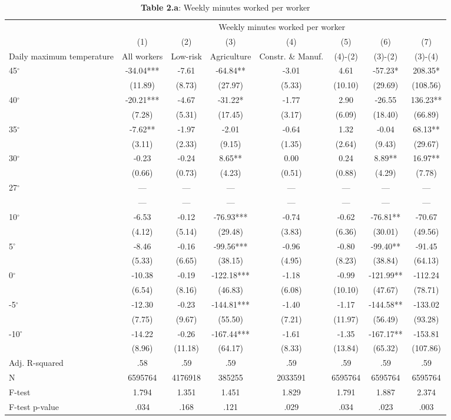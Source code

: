 \begin{table}[H]
\centering
\caption{\textbf{Table 2.a}: Weekly minutes worked per worker}
\begin{tabular}{lccccccc}
\hline\hline
 & \multicolumn{7}{c}{Weekly minutes worked per worker} \\
\cline{2-8}
 & (1) & (2) & (3) & (4) & (5) & (6) & (7) \\
Daily maximum temperature & All workers & Low-risk & Agriculture & Constr. \& Manuf. & (4)-(2) & (3)-(2) & (3)-(4) \\
\hline
45$^\circ$ & -34.04*** & -7.61 & -64.84** & -3.01 & 4.61 & -57.23* & 208.35* \\
 & (11.89) & (8.73) & (27.97) & (5.33) & (10.10) & (29.69) & (108.56) \\
40$^\circ$ & -20.21*** & -4.67 & -31.22* & -1.77 & 2.90 & -26.55 & 136.23** \\
 & (7.28) & (5.31) & (17.45) & (3.17) & (6.09) & (18.40) & (66.89) \\
35$^\circ$ & -7.62** & -1.97 & -2.01 & -0.64 & 1.32 & -0.04 & 68.13** \\
 & (3.11) & (2.33) & (9.15) & (1.35) & (2.64) & (9.43) & (29.67) \\
30$^\circ$ & -0.23 & -0.24 & 8.65** & 0.00 & 0.24 & 8.89** & 16.97** \\
 & (0.66) & (0.73) & (4.23) & (0.51) & (0.88) & (4.29) & (7.78) \\
27$^\circ$ & --- & --- & --- & --- & --- & --- & --- \\
 & --- & --- & --- & --- & --- & --- & --- \\
10$^\circ$ & -6.53 & -0.12 & -76.93*** & -0.74 & -0.62 & -76.81** & -70.67 \\
 & (4.12) & (5.14) & (29.48) & (3.83) & (6.36) & (30.01) & (49.56) \\
5$^\circ$ & -8.46 & -0.16 & -99.56*** & -0.96 & -0.80 & -99.40** & -91.45 \\
 & (5.33) & (6.65) & (38.15) & (4.95) & (8.23) & (38.84) & (64.13) \\
0$^\circ$ & -10.38 & -0.19 & -122.18*** & -1.18 & -0.99 & -121.99** & -112.24 \\
 & (6.54) & (8.16) & (46.83) & (6.08) & (10.10) & (47.67) & (78.71) \\
-5$^\circ$ & -12.30 & -0.23 & -144.81*** & -1.40 & -1.17 & -144.58** & -133.02 \\
 & (7.75) & (9.67) & (55.50) & (7.21) & (11.97) & (56.49) & (93.28) \\
-10$^\circ$ & -14.22 & -0.26 & -167.44*** & -1.61 & -1.35 & -167.17** & -153.81 \\
 & (8.96) & (11.18) & (64.17) & (8.33) & (13.84) & (65.32) & (107.86) \\
\hline
Adj. R-squared & .58 & .59 & .59 & .59 & .59 & .59 & .59 \\
N & 6595764 & 4176918 & 385255 & 2033591 & 6595764 & 6595764 & 6595764 \\
F-test & 1.794 & 1.351 & 1.451 & 1.829 & 1.791 & 1.887 & 2.374 \\
F-test p-value & .034 & .168 & .121 & .029 & .034 & .023 & .003 \\
\hline\hline
\end{tabular}
\end{table}
